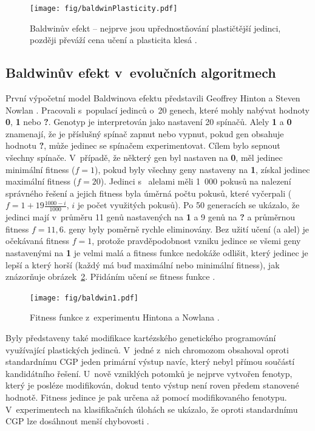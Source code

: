 \begin{figure}[htb]
    \centering\texttt{[image: fig/baldwinPlasticity.pdf]}
    \caption{Baldwinův efekt -- nejprve jsou upřednostňování plastičtější jedinci, později převáží cena učení a plasticita klesá \cite{EllefsenBalancing}.}
    \label{obrBaldwin}
\end{figure}

\subsection{Baldwinův efekt v~evolučních algoritmech}

První výpočetní model Baldwinova efektu představili Geoffrey Hinton a Steven Nowlan \cite{HintonNowlan}. Pracovali s~populací jedinců o~20 genech, které mohly nabývat hodnoty \textbf{0}, \textbf{1} nebo \textbf{?}. Genotyp je interpretován jako nastavení 20 spínačů. Alely \textbf{1} a \textbf{0} znamenají, že je příslušný spínač zapnut nebo vypnut, pokud gen obsahuje hodnotu \textbf{?}, může jedinec se spínačem experimentovat. Cílem bylo sepnout všechny spínače. V~případě, že některý gen byl nastaven na \textbf{0}, měl jedinec minimální fitness ($f = 1$), pokud byly všechny geny nastaveny na \textbf{1}, získal jedinec maximální fitness ($f = 20$). Jedinci s~ alelami měli 1~000 pokusů na nalezení správného řešení a jejich fitness byla úměrná počtu pokusů, které vyčerpali ($f = 1 + 19 \frac{1000 - i}{1000}$, $i$ je počet využitých pokusů). Po 50 generacích se ukázalo, že jedinci mají v~průměru 11 genů nastavených na \textbf{1} a 9 genů na \textbf{?} a průměrnou fitness $f = 11,6$.  geny byly poměrně rychle eliminovány. Bez užití učení (a  alel) je očekávaná fitness $f = 1$, protože pravděpodobnost vzniku jedince se všemi geny nastavenými na \textbf{1} je velmi malá a fitness funkce nedokáže odlišit, který jedinec je lepší a který horší (každý má buď maximální nebo minimální fitness), jak znázorňuje obrázek~\ref{obrHintonNowlan}. Přidáním učení se fitness funkce .

\begin{figure}[htb]
    \centering\texttt{[image: fig/baldwin1.pdf]}
    \caption{Fitness funkce z~experimentu Hintona a Nowlana \cite{HintonNowlan}.}
    \label{obrHintonNowlan}
\end{figure}

Byly představeny také modifikace kartézského genetického programování využívající plastických jedinců.
V~jedné z~nich chromozom obsahoval oproti standardnímu CGP jeden primární výstup navíc, který nebyl přímou součástí kandidátního řešení. U~nově vzniklých potomků je nejprve vytvořen fenotyp, který je posléze modifikován, dokud tento výstup není roven předem stanovené hodnotě. Fitness jedince je pak určena až pomocí modifikovaného fenotypu. V~experimentech na klasifikačních úlohách se ukázalo, že oproti standardnímu CGP lze dosáhnout menší chybovosti \cite{UllahPlasticCGP}.

